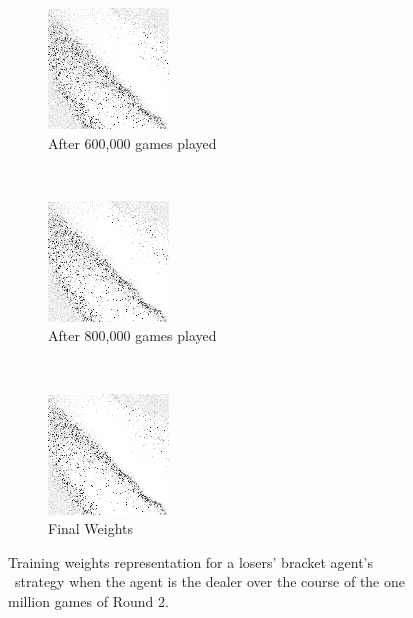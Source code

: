 \begin{figure}
	\begin{subfigure}[t]{0.2\textwidth}
	\includegraphics[width=\stratgraphwidth]{images/findings/round2/flipbook/loser/checkpoint_600000.png}
	\caption{After 600,000 games played}
	\end{subfigure}
	~
	\begin{subfigure}[t]{0.2\textwidth}
	\includegraphics[width=\stratgraphwidth]{images/findings/round2/flipbook/loser/checkpoint_800000.png}
	\caption{After 800,000 games played}
	\end{subfigure}
	~
	\begin{subfigure}[t]{0.2\textwidth}
	\includegraphics[width=\stratgraphwidth]{images/findings/round2/flipbook/loser/checkpoint_999999.png}
	\caption{Final Weights}
	\end{subfigure}

\caption{
	Training weights representation for a losers' bracket agent's \handmaxavg\
	strategy when the agent is the dealer
	over the course of the one million games of Round 2.
}
\label{fig:r2-flip-loser}
\end{figure}
